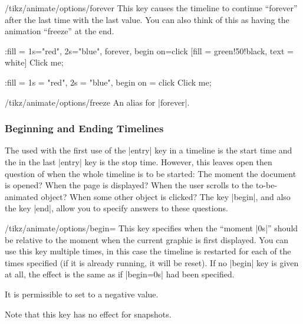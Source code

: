 \begin{key}{/tikz/animate/options/forever}
  This key causes the timeline to continue ``forever'' after the last
  time with the last value. You can also think of this as having the
  animation ``freeze'' at the end.
\begin{codeexample}[animation list = {0.5,1,1.5,2,2.5}]
\tikz \node :fill = { 1s="red", 2s="blue", forever, begin on=click}
  [fill = green!50!black, text = white] {Click me};
\end{codeexample}
\begin{codeexample}[animation list = {0.5,1,1.5,2,2.5}]
\tikz \node [fill = green!50!black, text = white] 
    :fill = { 1s = "red", 2s = "blue", begin on = click }
  {Click me};
\end{codeexample}
\end{key}

\begin{key}{/tikz/animate/options/freeze}
  An alias for |forever|.
\end{key}

\subsubsection{Beginning and Ending Timelines}

\label{section-anim-begin-end}

The  used with the first use of the |entry| key in a
timeline is the start time and the  in the last |entry| key
is the stop time. However, this leaves open then question of when the whole
timeline is to be started: The moment the document is opened? When the
page is displayed? When the user scrolls to the to-be-animated object?
When some other object is clicked? The key |begin|, and also the key
|end|, allow you to specify answers to these questions.

\begin{key}{/tikz/animate/options/begin=}
  This key specifies when the ``moment |0s|'' should be relative to
  the moment when the current graphic is first displayed. You can use
  this key multiple times, in this case the timeline is restarted for
  each of the times specified (if it is already running, it will be
  reset). If no |begin| key is given at all, the effect is the same as
  if |begin=0s| had been specified.

  It is permissible to set  to a negative value.

  Note that this key has no effect for snapshots.
\end{key}

